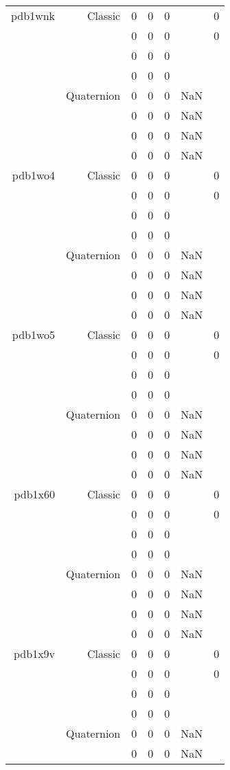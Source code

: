 \begin{xltabular}{\textwidth}{r|rcccSc}
pdb1wnk & Classic & 0 & 0 & 0 & & 0 \\
& & 0 & 0 & 0 & & 0 \\
& & 0 & 0 & 0 & & \\
& & 0 & 0 & 0 & & \\
& Quaternion & 0 & 0 & 0 & NaN & \\
& & 0 & 0 & 0 & NaN & \\
& & 0 & 0 & 0 & NaN & \\
& & 0 & 0 & 0 & NaN & \\ \addlinespace
pdb1wo4 & Classic & 0 & 0 & 0 & & 0 \\
& & 0 & 0 & 0 & & 0 \\
& & 0 & 0 & 0 & & \\
& & 0 & 0 & 0 & & \\
& Quaternion & 0 & 0 & 0 & NaN & \\
& & 0 & 0 & 0 & NaN & \\
& & 0 & 0 & 0 & NaN & \\
& & 0 & 0 & 0 & NaN & \\ \addlinespace
pdb1wo5 & Classic & 0 & 0 & 0 & & 0 \\
& & 0 & 0 & 0 & & 0 \\
& & 0 & 0 & 0 & & \\
& & 0 & 0 & 0 & & \\
& Quaternion & 0 & 0 & 0 & NaN & \\
& & 0 & 0 & 0 & NaN & \\
& & 0 & 0 & 0 & NaN & \\
& & 0 & 0 & 0 & NaN & \\ \addlinespace
pdb1x60 & Classic & 0 & 0 & 0 & & 0 \\
& & 0 & 0 & 0 & & 0 \\
& & 0 & 0 & 0 & & \\
& & 0 & 0 & 0 & & \\
& Quaternion & 0 & 0 & 0 & NaN & \\
& & 0 & 0 & 0 & NaN & \\
& & 0 & 0 & 0 & NaN & \\
& & 0 & 0 & 0 & NaN & \\ \addlinespace
pdb1x9v & Classic & 0 & 0 & 0 & & 0 \\
& & 0 & 0 & 0 & & 0 \\
& & 0 & 0 & 0 & & \\
& & 0 & 0 & 0 & & \\
& Quaternion & 0 & 0 & 0 & NaN & \\
& & 0 & 0 & 0 & NaN & \\

\end{xltabular}
